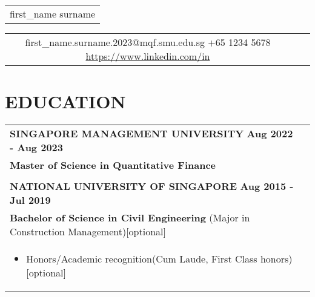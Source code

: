 \documentclass[a4paper,8pt]{article}
\begin{document}
\pagestyle{empty} 

\begin{tabularx}{\linewidth}{@{} C @{}}
\Huge{first\_name surname} \\[6pt]
\end{tabularx}

\begin{tabularx}{\linewidth}{@{} C @{} C @{} C}
{{\raisebox{-0.05\height}{\faEnvelope} first\_name.surname.2023@mqf.smu.edu.sg}} 
{{\raisebox{-0.05\height}{\faMobile} +65 1234 5678}} 
{{\href{https://www.linkedin.com/in/nameisjamiele}{\raisebox{-0.05\height}{\faLinkedin} https://www.linkedin.com/in}}}
\end{tabularx}

\section{\textbf{EDUCATION}}
\begin{tabularx}{\linewidth}{ @{}l r@{}}
\textbf{SINGAPORE MANAGEMENT UNIVERSITY} \hfill \textbf{Aug 2022 - Aug 2023} \\[4pt]
\textbf{Master of Science in Quantitative Finance}\\[4pt]
\\[4pt]
\textbf{NATIONAL UNIVERSITY OF SINGAPORE} \hfill \textbf{Aug 2015 - Jul 2019}\\[4pt]
\textbf{Bachelor of Science in Civil Engineering} (Major in Construction Management)[optional]\\[4pt]
\begin{minipage}[t]{\linewidth}
    \begin{itemize}[nosep, after=\strut, leftmargin=1em, itemsep=2pt]
        \item Honors/Academic recognition(Cum Laude, First Class honors)[optional]
    \end{itemize}
\end{minipage}
\end{tabularx}

\end{document}

